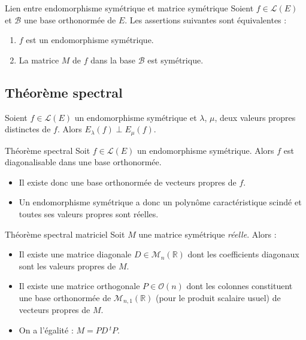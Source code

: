 \documentclass[french,11pt,twoside]{VcCours}
\begin{document}
\begin{Proposition}{Lien entre endomorphisme symétrique et matrice symétrique}
Soient $f \in \mathcal{L}(E)$ et $\mathcal{B}$ une base orthonormée de $E$. Les assertions suivantes sont équivalentes :
\begin{enumerate}
\item $f$ est un endomorphisme symétrique.
\item La matrice $M$ de $f$ dans la base $\mathcal{B}$ est symétrique.
\end{enumerate}
\end{Proposition}

\begin{Demonstration}{}
\vspace{7cm}
\end{Demonstration}

\subsection{Théorème spectral}
\begin{Proposition}{} Soient $f \in \mathcal{L}(E)$ un endomorphisme symétrique et $\lambda$, $\mu$, deux valeurs propres distinctes de $f$. Alors $E_{\lambda}(f) \perp E_{\mu}(f)$.
\end{Proposition}

\begin{Demonstration}{}
\vspace{5cm}
\end{Demonstration}

\begin{Theoreme}{Théorème spectral}
Soit $f \in \mathcal{L}(E)$ un endomorphisme symétrique. Alors $f$ est diagonalisable dans une base orthonormée.
\end{Theoreme}

\begin{Remarques}{}
\begin{itemize} 
\item Il existe donc une base orthonormée de vecteurs propres de $f$.
\item Un endomorphisme symétrique a donc un polynôme caractéristique scindé et toutes ses valeurs propres sont réelles.
\end{itemize}
\end{Remarques}

\begin{Theoreme}{Théorème spectral matriciel}
Soit $M$ une matrice symétrique \emph{réelle}. Alors :
\begin{itemize}
\item Il existe une matrice diagonale $D \in \mathcal{M}_n(\mathbb{R})$ dont les coefficients diagonaux sont les valeurs propres de $M$.
\item Il existe une matrice orthogonale $P \in \mathcal{O}(n)$ dont les colonnes constituent une base orthonormée de $\mathcal{M}_{n,1}(\mathbb{R})$ (pour le produit scalaire usuel) de vecteurs propres de $M$.
\item On a l'égalité : $M = P D \, ^tP$.
\end{itemize}
\end{Theoreme}
\end{document}
